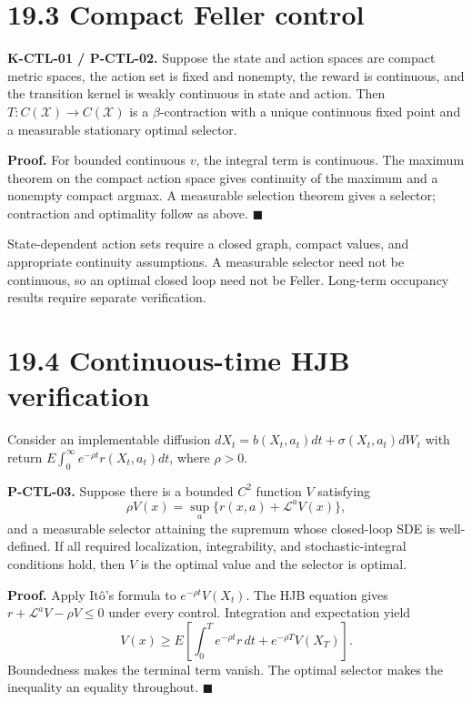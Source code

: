 \documentclass[
  english,
  11pt,
  oneside]{book}
\newcounter{none} %
\begin{document}
\section{19.3 Compact Feller control}\label{compact-feller-control}

\hypertarget{p-ctl-02}{}\label{p-ctl-02}

\textbf{K-CTL-01 / P-CTL-02.} Suppose the state and action spaces are compact metric spaces, the action set is fixed and nonempty, the reward is continuous, and the transition kernel is weakly continuous in state and action. Then \(T:C(\mathcal X)\to C(\mathcal X)\) is a \(\beta\)-contraction with a unique continuous fixed point and a measurable stationary optimal selector.

\textbf{Proof.} For bounded continuous \(v\), the integral term is continuous. The maximum theorem on the compact action space gives continuity of the maximum and a nonempty compact argmax. A measurable selection theorem gives a selector; contraction and optimality follow as above. \(\blacksquare\)

State-dependent action sets require a closed graph, compact values, and appropriate continuity assumptions. A measurable selector need not be continuous, so an optimal closed loop need not be Feller. Long-term occupancy results require separate verification.

\section{19.4 Continuous-time HJB verification}\label{continuous-time-hjb-verification}

Consider an implementable diffusion \(dX_t=b(X_t,a_t)dt+\sigma(X_t,a_t)dW_t\) with return \(E\int_0^\infty e^{-\rho t}r(X_t,a_t)dt\), where \(\rho>0\).

\hypertarget{p-ctl-03}{}\label{p-ctl-03}

\textbf{P-CTL-03.} Suppose there is a bounded \(C^2\) function \(V\) satisfying \[\rho V(x)=\sup_a\{r(x,a)+\mathcal L^aV(x)\},\] and a measurable selector attaining the supremum whose closed-loop SDE is well-defined. If all required localization, integrability, and stochastic-integral conditions hold, then \(V\) is the optimal value and the selector is optimal.

\textbf{Proof.} Apply Itô's formula to \(e^{-\rho t}V(X_t)\). The HJB equation gives \(r+\mathcal L^aV-\rho V\le0\) under every control. Integration and expectation yield \[V(x)\ge E\left[\int_0^T e^{-\rho t}r\,dt+e^{-\rho T}V(X_T)\right].\] Boundedness makes the terminal term vanish. The optimal selector makes the inequality an equality throughout. \(\blacksquare\)
\end{document}
